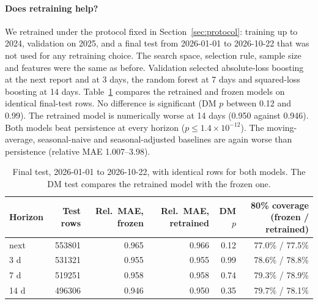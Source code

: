 \paragraph{Does retraining help?}
We retrained under the protocol fixed in Section~\ref{sec:protocol}: training up to 2024, validation on 2025, and a final test from 2026-01-01 to 2026-10-22 that was not used for any retraining choice.
The search space, selection rule, sample size and features were the same as before.
Validation selected absolute-loss boosting at the next report and at 3 days, the random forest at 7 days and squared-loss boosting at 14 days.
Table~\ref{tab:retrain} compares the retrained and frozen models on identical final-test rows.
No difference is significant (DM $p$ between 0.12 and 0.99). The retrained model is numerically worse at 14 days (0.950 against 0.946).
Both models beat persistence at every horizon ($p\le1.4\times10^{-12}$). The moving-average, seasonal-naive and seasonal-adjusted baselines are again worse than persistence (relative MAE 1.007--3.98).

\begin{table}[t]\centering\small\setlength{\tabcolsep}{4pt}
\caption{Final test, 2026-01-01 to 2026-10-22, with identical rows for both models. The DM test compares the retrained model with the frozen one.}\label{tab:retrain}
\begin{tabular}{@{}lrrrrr@{}}\toprule
Horizon & Test rows & Rel.\ MAE, frozen & Rel.\ MAE, retrained & DM $p$ & 80\% coverage (frozen / retrained)\\\midrule
next & \num{553801} & 0.965 & 0.966 & 0.12 & 77.0\% / 77.5\%\\
3 d & \num{531321} & 0.955 & 0.955 & 0.99 & 78.6\% / 78.8\%\\
7 d & \num{519251} & 0.958 & 0.958 & 0.74 & 79.3\% / 78.9\%\\
14 d & \num{496306} & 0.946 & 0.950 & 0.35 & 79.7\% / 78.1\%\\\bottomrule
\end{tabular}\end{table}

